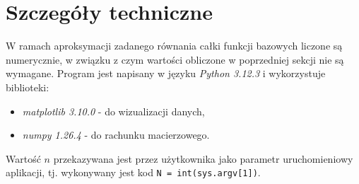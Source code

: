 \documentclass[a4paper,12pt]{article}
\begin{document}
    \section{Szczegóły techniczne}
    W ramach aproksymacji zadanego równania całki funkcji bazowych liczone są numerycznie, w związku z czym wartości obliczone w poprzedniej sekcji nie są wymagane.
    Program jest napisany w języku \textit{Python 3.12.3} i wykorzystuje biblioteki:
    \begin{itemize}
        \item \textit{matplotlib 3.10.0} - do wizualizacji danych,
        \item \textit{numpy 1.26.4} - do rachunku macierzowego.
    \end{itemize}
    Wartość \(n\) przekazywana jest przez użytkownika jako parametr uruchomieniowy aplikacji, tj. wykonywany jest kod \lstinline{N = int(sys.argv[1])}.
\end{document}
